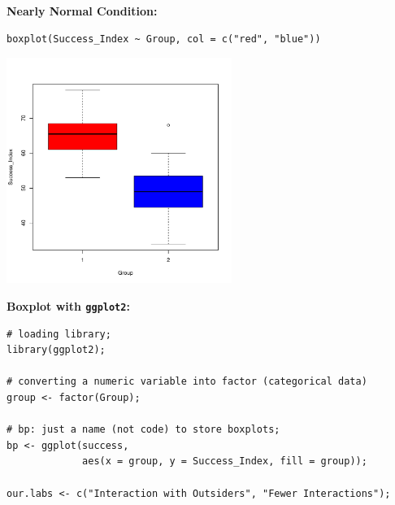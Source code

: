\begin{example}
\begin{minipage}{\textwidth}
\label{fig:qqplot-group2}
\end{minipage}

\vspace{1.00em}

\noindent\textbf{Nearly Normal Condition:}
\begin{tcolorbox}[colback=gray!10, colframe=black!45, arc=2mm,
  before skip=4pt, after skip=4pt]
\begin{verbatim}
boxplot(Success_Index ~ Group, col = c("red", "blue"))
\end{verbatim}
\end{tcolorbox}
\noindent
\begin{minipage}{\textwidth}
\centering
\includegraphics[width=0.55\textwidth]{section14/images/boxplot_success_index.pdf}
\vspace{-0.5em}

\label{fig:boxplot-success}
\end{minipage}
\vspace{-1,00em}

\noindent\textbf{Boxplot with \texttt{ggplot2}:}
\begin{tcolorbox}[colback=gray!10, colframe=black!45, arc=2mm,
  before skip=4pt, after skip=4pt]
\begin{verbatim}
# loading library;
library(ggplot2);

# converting a numeric variable into factor (categorical data)
group <- factor(Group);

# bp: just a name (not code) to store boxplots;
bp <- ggplot(success,
             aes(x = group, y = Success_Index, fill = group));

our.labs <- c("Interaction with Outsiders", "Fewer Interactions");


\end{verbatim}
\end{tcolorbox}
\end{example}
